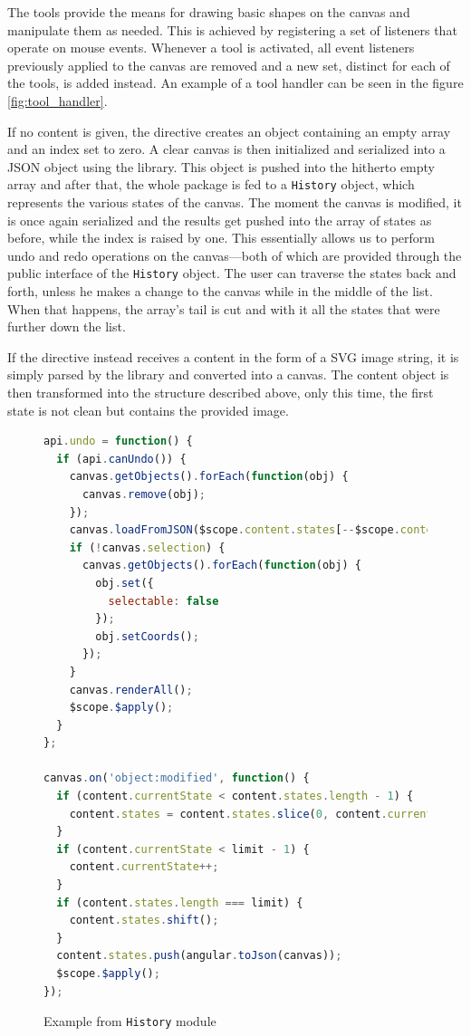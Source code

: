 \documentclass[thesis=M,english,hidelinks]{FITthesis}[2012/10/20]
\newcommand{\code}{\texttt}
\begin{document}
The tools provide the means for drawing basic shapes on the canvas and manipulate them as needed. This is achieved by registering a set of listeners that operate on mouse events. Whenever a tool is activated, all event listeners previously applied to the canvas are removed and a new set, distinct for each of the tools, is added instead. An example of a tool handler can be seen in the figure \ref{fig:tool_handler}.

If no content is given, the directive creates an object containing an empty array and an index set to zero. A clear canvas is then initialized and serialized into a JSON object using the library. This object is pushed into the hitherto empty array and after that, the whole package is fed to a \code{History} object, which represents the various states of the canvas. The moment the canvas is modified, it is once again serialized and the results get pushed into the array of states as before, while the index is raised by one. This essentially allows us to perform undo and redo operations on the canvas---both of which are provided through the public interface of the \code{History} object. The user can traverse the states back and forth, unless he makes a change to the canvas while in the middle of the list. When that happens, the array's tail is cut and with it all the states that were further down the list.

If the directive instead receives a content in the form of a SVG image string, it is simply parsed by the library and converted into a canvas. The content object is then transformed into the structure described above, only this time, the first state is not clean but contains the provided image.

\begin{figure}
  \begin{lstlisting}[language=JavaScript]
api.undo = function() {
  if (api.canUndo()) {
    canvas.getObjects().forEach(function(obj) {
      canvas.remove(obj);
    });
    canvas.loadFromJSON($scope.content.states[--$scope.content.currentState]);
    if (!canvas.selection) {
      canvas.getObjects().forEach(function(obj) {
        obj.set({
          selectable: false
        });
        obj.setCoords();
      });
    }
    canvas.renderAll();
    $scope.$apply();
  }
};

canvas.on('object:modified', function() {
  if (content.currentState < content.states.length - 1) {
    content.states = content.states.slice(0, content.currentState + 1);
  }
  if (content.currentState < limit - 1) {
    content.currentState++;
  }
  if (content.states.length === limit) {
    content.states.shift();
  }
  content.states.push(angular.toJson(canvas));
  $scope.$apply();
});
  \end{lstlisting}
  \caption{Example from \code{History} module}
  \label{fig:history_module}
\end{figure}
\end{document}
